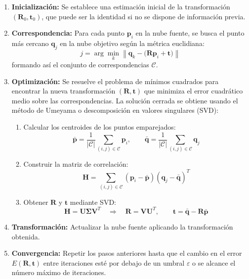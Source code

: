 \documentclass[12pt, a4paper, twoside]{article}
\begin{document}
\begin{itemize}
\begin{itemize}
    \begin{enumerate}
      \item \textbf{Inicialización:} Se establece una estimación inicial de la transformación $(\mathbf{R}_0, \mathbf{t}_0)$, que puede ser la identidad si no se dispone 
      de información previa.
      \item \textbf{Correspondencia:} Para cada punto $\mathbf{p}_i$ en la nube fuente, se busca el punto más cercano $\mathbf{q}_j$ en la nube objetivo según la métrica 
      euclidiana:
      \[
      j = \arg\min_{k} \left\| \mathbf{q}_k - \big(\mathbf{R}\mathbf{p}_i + \mathbf{t}\big) \right\|
      \]
      formando así el conjunto de correspondencias $\mathcal{C}$.
      \item \textbf{Optimización:} Se resuelve el problema de mínimos cuadrados para encontrar la nueva transformación $(\mathbf{R}, \mathbf{t})$ que minimiza el error 
      cuadrático medio sobre las correspondencias. La solución cerrada se obtiene usando el método de Umeyama o descomposición en valores singulares (SVD):
      \begin{enumerate}
        \item Calcular los centroides de los puntos emparejados:
        \[
        \bar{\mathbf{p}} = \frac{1}{|\mathcal{C}|} \sum_{(i,j) \in \mathcal{C}} \mathbf{p}_i,
        \qquad
        \bar{\mathbf{q}} = \frac{1}{|\mathcal{C}|} \sum_{(i,j) \in \mathcal{C}} \mathbf{q}_j
        \]
        \item Construir la matriz de correlación:
        \[
        \mathbf{H} = \sum_{(i,j) \in \mathcal{C}}
        (\mathbf{p}_i - \bar{\mathbf{p}})
        (\mathbf{q}_j - \bar{\mathbf{q}})^{T}
        \]
        \item Obtener $\mathbf{R}$ y $\mathbf{t}$ mediante SVD:
        \[
        \mathbf{H} = \mathbf{U} \mathbf{\Sigma} \mathbf{V}^{T}
        \quad \Rightarrow \quad
        \mathbf{R} = \mathbf{V} \mathbf{U}^{T},
        \qquad
        \mathbf{t} = \bar{\mathbf{q}} - \mathbf{R}\bar{\mathbf{p}}
        \]
      \end{enumerate}
      \item \textbf{Transformación:} Actualizar la nube fuente aplicando la transformación obtenida.
      \item \textbf{Convergencia:} Repetir los pasos anteriores hasta que el cambio en el error $E(\mathbf{R}, \mathbf{t})$ entre iteraciones esté por debajo de un umbral 
      $\varepsilon$ o se alcance el número máximo de iteraciones.
    \end{enumerate}

\end{itemize}
\end{itemize}
\end{document}
